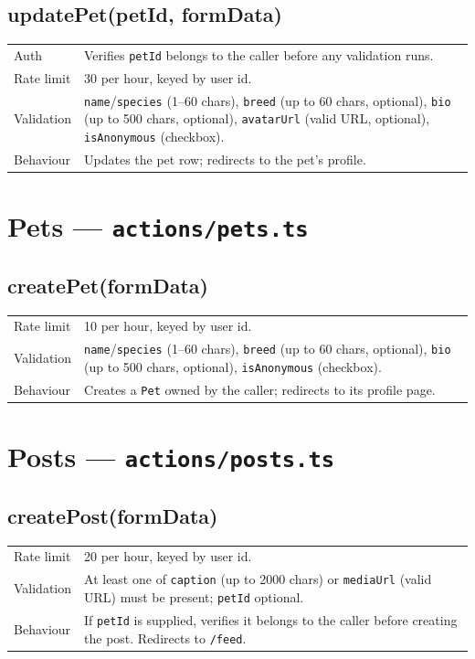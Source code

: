 \documentclass[11pt,a4paper]{article}
\makeatletter
\newcommand{\actiontable}[1]{%
  \begin{tabular}{@{}p{2.6cm}p{10.9cm}@{}}
  #1
  \end{tabular}
}
\makeatother
\begin{document}
\subsection{updatePet(petId, formData)}
\actiontable{
Auth & Verifies \texttt{petId} belongs to the caller before any validation runs. \\
Rate limit & 30 per hour, keyed by user id. \\
Validation & \texttt{name}/\texttt{species} (1--60 chars), \texttt{breed} (up to 60
  chars, optional), \texttt{bio} (up to 500 chars, optional), \texttt{avatarUrl} (valid
  URL, optional), \texttt{isAnonymous} (checkbox). \\
Behaviour & Updates the pet row; redirects to the pet's profile. \\
}

\section{Pets --- \texttt{actions/pets.ts}}

\subsection{createPet(formData)}
\actiontable{
Rate limit & 10 per hour, keyed by user id. \\
Validation & \texttt{name}/\texttt{species} (1--60 chars), \texttt{breed} (up to 60
  chars, optional), \texttt{bio} (up to 500 chars, optional), \texttt{isAnonymous}
  (checkbox). \\
Behaviour & Creates a \texttt{Pet} owned by the caller; redirects to its profile page. \\
}

\section{Posts --- \texttt{actions/posts.ts}}

\subsection{createPost(formData)}
\actiontable{
Rate limit & 20 per hour, keyed by user id. \\
Validation & At least one of \texttt{caption} (up to 2000 chars) or \texttt{mediaUrl}
  (valid URL) must be present; \texttt{petId} optional. \\
Behaviour & If \texttt{petId} is supplied, verifies it belongs to the caller before
  creating the post. Redirects to \texttt{/feed}. \\
}
\end{document}
